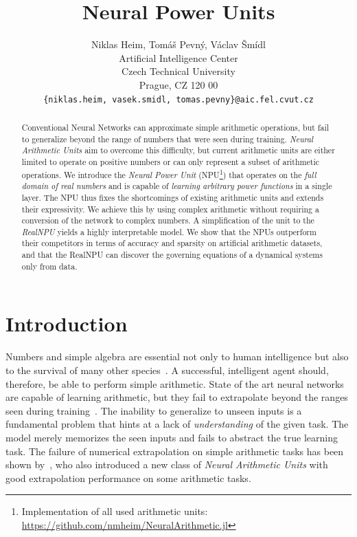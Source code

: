 \documentclass[9pt]{article}
\title{Neural Power Units}
\author{
  Niklas Heim,
  Tom\'a\v s Pevn\'y,
  V\'aclav \v Sm\'idl\\
  Artificial Intelligence Center\\
  Czech Technical University\\
  Prague, CZ 120 00\\
  \texttt{\{niklas.heim, vasek.smidl, tomas.pevny\}@aic.fel.cvut.cz}\\
}
\begin{document}
\maketitle

\begin{abstract}
  Conventional Neural Networks can approximate simple arithmetic operations,
  but fail to generalize beyond the range of numbers that were seen during
  training.  \emph{Neural Arithmetic Units} aim to overcome this difficulty,
  but current arithmetic units are either limited to operate on positive
  numbers or can only represent a subset of arithmetic operations. We introduce
  the \emph{Neural Power Unit} (NPU\footnote{Implementation of all used arithmetic units: \url{https://github.com/nmheim/NeuralArithmetic.jl} }) that operates on the \emph{full domain of
  real numbers} and is capable of \emph{learning arbitrary power functions} in
  a single layer.  The NPU thus fixes the shortcomings of existing arithmetic
  units and extends their expressivity. We achieve this by using
  complex arithmetic without requiring a conversion of the network to complex
  numbers. A simplification of the unit to the \emph{RealNPU} yields a highly interpretable model.
  We show that the NPUs outperform their competitors in terms of
  accuracy and sparsity on artificial arithmetic datasets, and that the RealNPU can discover
  the governing equations of a dynamical systems only from data.
\end{abstract}


\section{Introduction}%
\label{sec:introduction}

Numbers and simple algebra are essential not only to human intelligence but
also to the survival of many other
species~\citep{dehaene_number_2011,gallistel_finding_2018}. A successful,
intelligent agent should, therefore, be able to perform simple arithmetic.  State
of the art neural networks are capable of learning arithmetic, but they
fail to extrapolate beyond the ranges seen during
training~\citep{suzgun_evaluating_2018,lake_generalization_2018}.  The
inability to generalize to unseen inputs is a fundamental problem that hints at
a lack of \emph{understanding} of the given task. The model merely memorizes
the seen inputs and fails to abstract the true learning task.  The failure of
numerical extrapolation on simple arithmetic tasks has been shown
by~\cite{trask_neural_2018}, who also introduced a new class of \emph{Neural
Arithmetic Units} with good extrapolation performance on some arithmetic
tasks.
\end{document}
